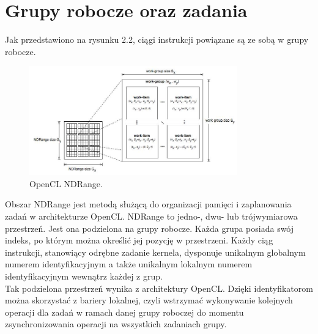 \section{Grupy robocze oraz zadania}
Jak przedstawiono na rysunku 2.2, ciągi instrukcji powiązane są ze sobą w grupy robocze. \\
\begin{figure}[h]
\centering
\includegraphics[width=0.8\textwidth]{figures/ndrange.jpg}
\caption{OpenCL NDRange.\protect\footnotemark}%
\label{rys:ndrange}
\end{figure}
Obszar NDRange jest metodą służącą do organizacji pamięci i zaplanowania zadań w architekturze OpenCL. NDRange to jedno-, dwu- lub trójwymiarowa przestrzeń. Jest ona podzielona na grupy robocze. Każda grupa posiada swój indeks, po którym można określić jej pozycję w przestrzeni. Każdy ciąg instrukcji, stanowiący odrębne zadanie kernela, dysponuje unikalnym globalnym numerem identyfikacyjnym a także unikalnym lokalnym numerem identyfikacyjnym wewnątrz każdej z grup.  \\
Tak podzielona przestrzeń wynika z architektury OpenCL. Dzięki identyfikatorom można skorzystać z bariery lokalnej, czyli wstrzymać wykonywanie kolejnych operacji dla zadań w ramach danej grupy roboczej do momentu zsynchronizowania operacji na wszystkich zadaniach grupy.

